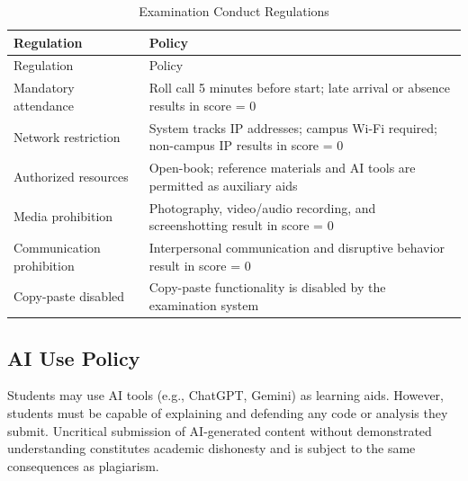 \documentclass[
]{article}
\begin{document}
\begin{longtable}[]{@{}
  >{\raggedright\arraybackslash}p{}
  >{\raggedright\arraybackslash}p{}@{}}
\caption{Examination Conduct Regulations}\tabularnewline
\toprule\noalign{}
\begin{minipage}[b]{\linewidth}\raggedright
Regulation
\end{minipage} & \begin{minipage}[b]{\linewidth}\raggedright
Policy
\end{minipage} \\
\midrule\noalign{}
\endfirsthead
\toprule\noalign{}
\begin{minipage}[b]{\linewidth}\raggedright
Regulation
\end{minipage} & \begin{minipage}[b]{\linewidth}\raggedright
Policy
\end{minipage} \\
\midrule\noalign{}
\endhead
\bottomrule\noalign{}
\endlastfoot
Mandatory attendance & Roll call 5 minutes before start; late arrival or
absence results in score = 0 \\
Network restriction & System tracks IP addresses; campus Wi-Fi required;
non-campus IP results in score = 0 \\
Authorized resources & Open-book; reference materials and AI tools are
permitted as auxiliary aids \\
Media prohibition & Photography, video/audio recording, and
screenshotting result in score = 0 \\
Communication prohibition & Interpersonal communication and disruptive
behavior result in score = 0 \\
Copy-paste disabled & Copy-paste functionality is disabled by the
examination system \\
\end{longtable}

\subsection{AI Use Policy}\label{ai-use-policy}

Students may use AI tools (e.g., ChatGPT, Gemini) as learning aids.
However, students must be capable of explaining and defending any code
or analysis they submit. Uncritical submission of AI-generated content
without demonstrated understanding constitutes academic dishonesty and
is subject to the same consequences as plagiarism.
\end{document}
